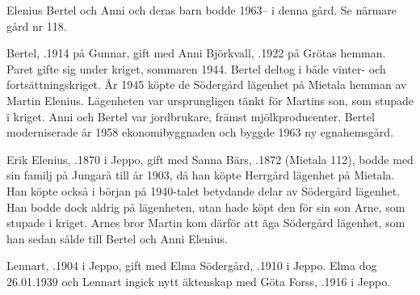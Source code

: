%
Elenius Bertel och Anni och deras barn bodde 1963-- i denna gård. Se närmare gård nr 118.\jhvspace{}



%


%
Bertel, .1914 på Gunnar, gift med Anni Björkvall, .1922 på Grötas hemman. Paret gifte sig under kriget, sommaren 1944. Bertel deltog i både vinter- och fortsättningskriget. År 1945 köpte de Södergård lägenhet på Mietala hemman av Martin Elenius. Lägenheten var ursprungligen tänkt för Martins son, som stupade i kriget. Anni och Bertel var jordbrukare, främst mjölkproducenter. Bertel moderniserade år 1958 ekonomibyggnaden och byggde 1963 ny egnahemsgård.
\begin{jhchildren}
  \item {}
  \item {}
\end{jhchildren}



%
Erik Elenius, .1870 i Jeppo, gift med Sanna Bärs, .1872 (Mietala 112), bodde med sin familj på Jungarå till år 1903, då han köpte Herrgård lägenhet på Mietala. Han köpte också i början på 1940-talet betydande delar av Södergård lägenhet. Han bodde dock aldrig på lägenheten, utan hade köpt den för sin son Arne, som stupade i kriget. Arnes bror Martin kom därför att äga Södergård lägenhet, som han sedan sålde till Bertel och Anni Elenius.


%
Lennart, .1904 i Jeppo, gift med Elma Södergård, .1910 i Jeppo. Elma dog 26.01.1939 och Lennart ingick nytt äktenskap med Göta Forss, .1916  i Jeppo.
\begin{jhchildren}
  \item {}
  \item {}
  \item {}
  \item {}
\end{jhchildren}

